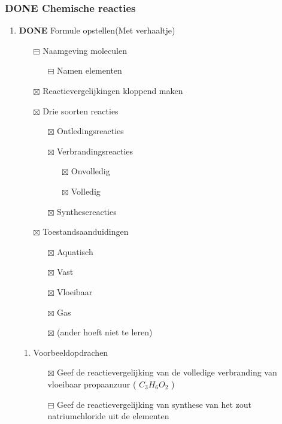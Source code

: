 \documentclass[11pt]{article}
\begin{document}
\subsubsection{{\bfseries\sffamily DONE} Chemische reacties}
\label{sec:org5d31ce7}
\begin{enumerate}
\item {\bfseries\sffamily DONE} Formule opstellen(Met verhaaltje)
\label{sec:org49b7de9}
\begin{itemize}
\item[{$\boxminus$}] Naamgeving moleculen
\begin{itemize}
\item[{$\boxminus$}] Namen elementen
\end{itemize}
\item[{$\boxtimes$}] Reactievergelijkingen kloppend maken
\item[{$\boxtimes$}] Drie soorten reacties
\begin{itemize}
\item[{$\boxtimes$}] Ontledingsreacties
\item[{$\boxtimes$}] Verbrandingsreacties
\begin{itemize}
\item[{$\boxtimes$}] Onvolledig
\item[{$\boxtimes$}] Volledig
\end{itemize}
\item[{$\boxtimes$}] Synthesereacties
\end{itemize}
\item[{$\boxtimes$}] Toestandsaanduidingen
\begin{itemize}
\item[{$\boxtimes$}] Aquatisch
\item[{$\boxtimes$}] Vast
\item[{$\boxtimes$}] Vloeibaar
\item[{$\boxtimes$}] Gas
\item[{$\boxtimes$}] (ander hoeft niet te leren)
\end{itemize}
\end{itemize}
\begin{enumerate}
\item Voorbeeldopdrachen
\label{sec:orga9dd9be}
\begin{itemize}
\item[{$\boxtimes$}] Geef de reactievergelijking van de volledige verbranding van vloeibaar propaanzuur ( \(C_3 H_6 O_2\) )
\item[{$\boxminus$}] Geef de reactievergelijking van synthese van het zout natriumchloride uit de elementen
\end{itemize}
\end{enumerate}
\end{enumerate}
\end{document}
